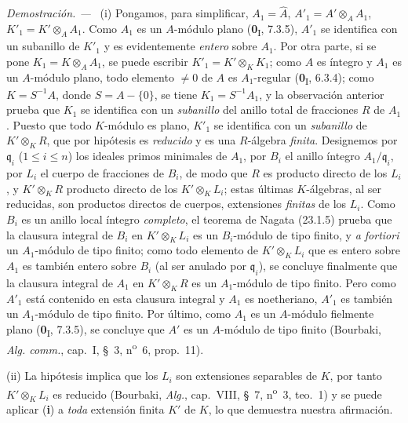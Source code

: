 \documentclass[10pt,oneside]{book}
\newcommand{\oldpage}[2][]{%
  \setcounter{footnote}{0}%
  \marginpar{\scriptsize\textbf{#1}~|~#2}\ignorespaces}
\newenvironment{proof}{%
  \par\medskip\noindent\textit{Demostración. ---\ }}{\par}
\providecommand{\setmin}{-}%
\begin{document}
\begin{proof}
(i) Pongamos, para simplificar, $A_1=\widehat A$,
$A'_1=A'\otimes_AA_1$, $K'_1=K'\otimes_AA_1$. Como $A_1$ es un
$A$-módulo plano (\textbf{0}\textsubscript{I}, 7.3.5), $A'_1$ se identifica con un
subanillo de $K'_1$ y es evidentemente \emph{entero} sobre $A_1$. Por otra parte, si
se pone $K_1=K\otimes_AA_1$, se puede escribir
$K'_1=K'\otimes_KK_1$; como $A$ es íntegro y $A_1$ es un $A$-módulo
plano, todo elemento $\neq0$ de $A$ es $A_1$-regular
(\textbf{0}\textsubscript{I}, 6.3.4); como $K=S^{-1}A$, donde $S=A\setmin\{0\}$, se tiene
$K_1=S^{-1}A_1$, y la observación anterior prueba que $K_1$ se identifica con un
\emph{subanillo} del anillo total de fracciones $R$ de $A_1$. Puesto que todo
$K$-módulo es plano, $K'_1$ se identifica con un \emph{subanillo} de $K'\otimes_KR$,
que por hipótesis es \emph{reducido} y es una $R$-álgebra \emph{finita}. Designemos por
$\mathfrak q_i$ ($1\leqslant i\leqslant n$) los ideales primos minimales de
$A_1$, por $B_i$ el anillo íntegro $A_1/\mathfrak q_i$, por $L_i$ el cuerpo de
fracciones de $B_i$, de modo que $R$ es producto directo de los $L_i$, y
$K'\otimes_KR$ producto directo de los $K'\otimes_KL_i$; estas últimas
$K$-álgebras, al ser reducidas, son productos directos de cuerpos,
extensiones \emph{finitas} de los $L_i$. Como $B_i$ es un anillo local íntegro
\emph{completo}, el teorema de Nagata (23.1.5) prueba que la clausura
integral de $B_i$ en $K'\otimes_KL_i$ es un $B_i$-módulo de tipo finito, y
\emph{a fortiori} un $A_1$-módulo de tipo finito; como todo elemento de
$K'\otimes_KL_i$ que es entero sobre $A_1$ es también entero sobre $B_i$ (al ser
anulado por $\mathfrak q_i$), se concluye finalmente que la clausura
integral de $A_1$ en $K'\otimes_KR$ es un $A_1$-módulo de tipo finito. Pero
como $A'_1$ está contenido en esta clausura integral y $A_1$ es
noetheriano, $A'_1$ es también un $A_1$-módulo de tipo finito. Por último, como $A_1$
es un $A$-módulo fielmente plano (\textbf{0}\textsubscript{I}, 7.3.5), se concluye
que $A'$ es un $A$-módulo de tipo finito (Bourbaki, \emph{Alg. comm.},
cap.~I, §~3, n\textsuperscript{o}~6, prop.~11).

\oldpage[0\textsubscript{IV-1}]{217}

(ii) La hipótesis implica que los $L_i$ son extensiones separables
de $K$, por tanto $K'\otimes_KL_i$ es reducido (Bourbaki, \emph{Alg.}, cap.~VIII,
§~7, n\textsuperscript{o}~3, teo.~1) y se puede aplicar (\textbf{i}) a \emph{toda}
extensión finita $K'$ de $K$, lo que demuestra nuestra afirmación.
\end{proof}
\end{document}
